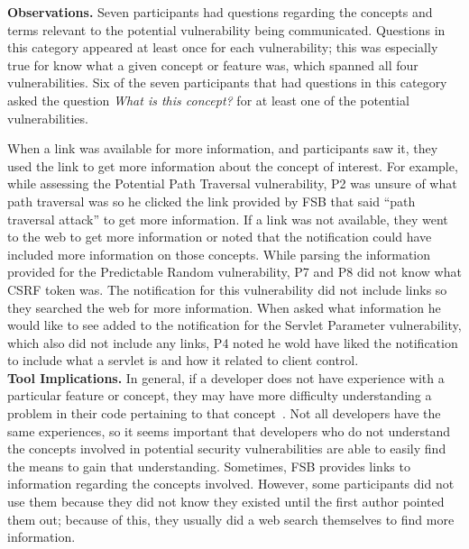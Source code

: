 \documentclass[conference]{IEEEtran}
\begin{document}
\noindent\textbf{Observations.}
Seven participants had questions regarding the concepts and terms relevant to the potential vulnerability being communicated. 
Questions in this category appeared at least once for each vulnerability; this was especially true for know what a given concept or feature was, which spanned all four vulnerabilities. 
Six of the seven participants that had questions in this category asked the question \textit{What is this concept?} for at least one of the potential vulnerabilities.


When a link was available for more information, and participants saw it, they used the link to get more information about the concept of interest.
For example, while assessing the Potential Path Traversal vulnerability, P2 was unsure of what path traversal was so he clicked the link provided by FSB that said ``path traversal attack'' to get more information.
If a link was not available, they went to the web to get more information or noted that the notification could have included more information on those concepts.
While parsing the information provided for the Predictable Random vulnerability, P7 and P8 did not know what CSRF token was.
The notification for this vulnerability did not include links so they searched the web for more information. 
When asked what information he would like to see added to the notification for the Servlet Parameter vulnerability, which also did not include any links, P4 noted he wold have liked the notification to include what a servlet is and how it related to client control.
\\

\noindent\textbf{Tool Implications.}
In general, if a developer does not have experience with a particular feature or concept, they may have more difficulty understanding a problem in their code pertaining to that concept~\cite{wiedenbeck1993mental}.
Not all developers have the same experiences, so it seems important that developers who do not understand the concepts involved in potential security vulnerabilities are able to easily find the means to gain that understanding.
Sometimes, FSB provides links to information regarding the concepts involved. 
However, some participants did not use them because they did not know they existed until the first author pointed them out; because of this, they usually did a web search themselves to find more information.
\end{document}
